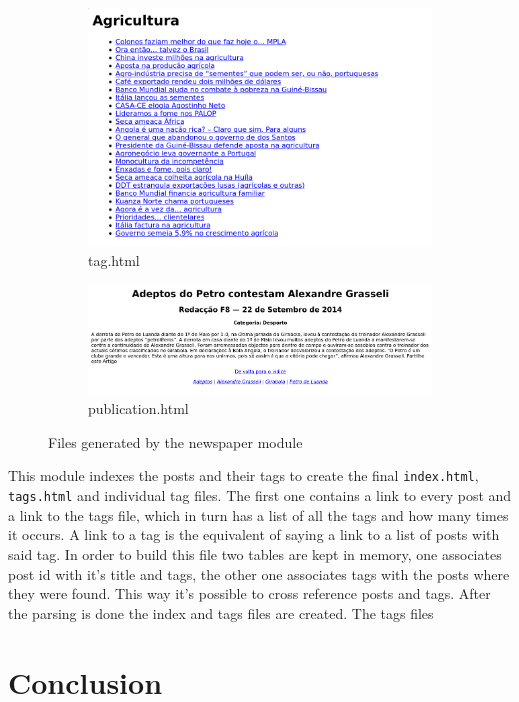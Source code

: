 \documentclass[a4paper]{article}
\begin{document}
\begin{figure}[H]
\begin{subfigure}{0.45\textwidth}
    \end{subfigure}
    \begin{subfigure}{0.45\textwidth}
        \includegraphics[width=\textwidth]{./tag_print.png}
        \caption{tag.html}
    \end{subfigure}
    \begin{subfigure}{0.54\textwidth}
        \includegraphics[width=\textwidth]{./publication_print.png}
        \caption{publication.html}
    \end{subfigure}
    \caption{Files generated by the newspaper module}
\end{figure}

This module indexes the posts and their tags to create the final \texttt{index.html}, \texttt{tags.html} and individual tag files. The first one contains a link to every post and a link to the tags file, which in turn has a list of all the tags and how many times it occurs. A link to a tag is the equivalent of saying a link to a list of posts with said tag. In order to build this file two tables are kept in memory, one associates post id with it's title and tags, the other one associates tags with the posts where they were found. This way it's possible to cross reference posts and tags. After the parsing is done the index and tags files are created. The tags files

\section{Conclusion}
\end{document}
